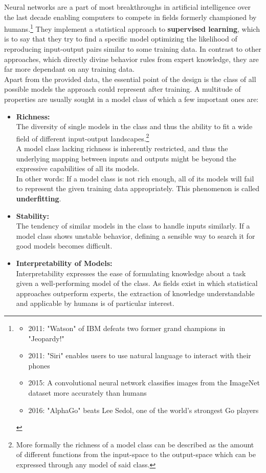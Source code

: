 Neural networks are a part of most breakthroughs in artificial intelligence over the last decade enabling computers to
compete in fields formerly championed by humans.\footnote{\begin{itemize}[topsep=0pt]
		\item 
		2011: "Watson" of IBM defeats two former grand champions in "Jeopardy!" \cite{lally2011natural}
		\item 
		2011: "Siri" enables users to use natural language to interact with their phones 
		\cite{ARON201124}
		\item 
		2015: A convolutional neural network classifies images from the ImageNet dataset more accurately than humans 
		\cite{Russakovsky2015} \cite{He_2015_ICCV}
		\item 
		2016: "AlphaGo" beats Lee Sedol, one of the world's strongest Go players
		\cite{gibney2016google} \cite{silver2017mastering}
	\end{itemize}
} They implement a statistical approach to \textbf{supervised learning},
which is to say that they try to find a specific model optimizing the likelihood of reproducing input-output pairs similar to some training data. In contrast to other approaches, which directly divine behavior rules from expert knowledge, they are far more dependant on any training data.\cite{Statistical-ML-Basics}\\
Apart from the provided data, the essential point of the design is the class of all possible models the approach could represent after training. A multitude of properties are usually sought in a model class of which a few important ones are:
\begin{itemize}
	\item \textbf{Richness:}\\
	The diversity of single models in the class and thus the ability to fit a wide field of different input-output landscapes.\footnote{More formally the richness of a model class can be described as the amount of different functions from the input-space to the output-space which can be expressed through any model of said class.}\\
	A model class lacking richness is inherently restricted, and thus the underlying mapping between inputs and outputs might be beyond the expressive capabilities of all its models.\\
	In other words: If a model class is not rich enough, all of its models will fail to represent the given training data appropriately. This phenomenon is called \textbf{underfitting}.
	\item \textbf{Stability:}\\ 
	The tendency of similar models in the class to handle inputs similarly.
	If a model class shows unstable behavior, defining a sensible way to search it for good models becomes difficult.
	\item \textbf{Interpretability of Models:}\\
	Interpretability expresses the ease of formulating knowledge about a task given a well-performing model of the class.
	As fields exist in which statistical approaches outperform experts, the extraction of knowledge understandable and applicable by humans is of particular interest.
\end{itemize}
